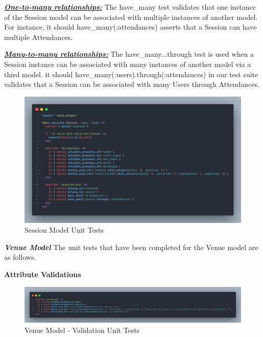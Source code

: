 \begin{justify}
\vspace{0.25cm}
\noindent\textbf{\textit{\underline{One-to-many relationships:}}} The have\_many test validates that one instance of the Session model can be associated with multiple instances of another model. For instance, it { should have\_many(:attendances) } asserts that a Session can have multiple Attendances.

\vspace{0.25cm}
\noindent\textbf{\textit{\underline{Many-to-many relationships:}}} The have\_many...through test is used when a Session instance can be associated with many instances of another model via a third model. it { should have\_many(:users).through(:attendances) } in our test suite validates that a Session can be associated with many Users through Attendances.


    \begin{figure}[H]
        \centerline{\includegraphics[width=140mm,scale=1]{figures/implementation_and_testing/testing/AUT/session/all.png}}
        \caption{Session Model Unit Tests}
        \label{Session Model Unit Tests}
    \end{figure}





\newendline \textbf{\textit{Venue Model}}\newendline
The unit tests that have been completed for the Venue model are as follows.

\vspace{0.25cm}
\newendline
\textbf{Attribute Validations}

    \begin{figure}[H]
        \centerline{\includegraphics[width=150mm,scale=1]{figures/implementation_and_testing/testing/AUT/venue/validations.png}}
        \caption{Venue Model - Validation Unit Tests}
        \label{Venue Model - Validation Unit Tests}
    \end{figure}


\end{justify}
